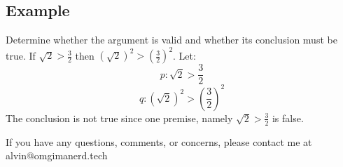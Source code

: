 \documentclass[letterpaper, 12pt]{math}
\begin{document}
\subsection*{Example}
Determine whether the argument is valid and whether its conclusion must be true.
If \( \sqrt{2} > \frac{3}{2} \) then \( (\sqrt{2})^{2} > (\frac{3}{2})^{2} \).
Let:
\[ p: \sqrt{2} > \frac{3}{2} \]
\[ q: (\sqrt{2})^{2} > (\frac{3}{2})^{2} \]
The conclusion is not true since one premise, namely
\( \sqrt{2} > \frac{3}{2} \) is false.

\begin{center}
  If you have any questions, comments, or concerns, please contact me at
  alvin@omgimanerd.tech
\end{center}
\end{document}
